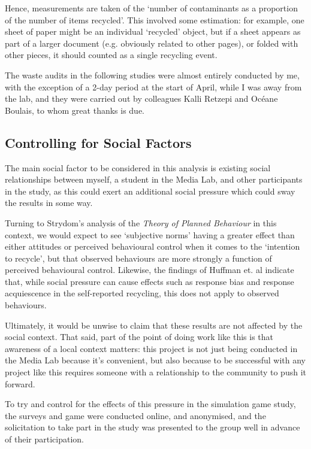 \documentclass[nofonts,nols,justified,nobib]{tufte-book}
\begin{document}
Hence, measurements are taken of the ‘number of contaminants as a proportion of the number of items recycled’. This involved some estimation: for example, one sheet of paper might be an individual ‘recycled’ object, but if a sheet appears as part of a larger document (e.g. obviously related to other pages), or folded with other pieces, it should counted as a single recycling event. 

The waste audits in the following studies were almost entirely conducted by me, with the exception of a 2-day period at the start of April, while I was away from the lab, and they were carried out by colleagues Kalli Retzepi and Oc\'eane Boulais, to whom great thanks is due.

\subsection*{Controlling for Social Factors}
The main social factor to be considered in this analysis is existing social relationships between myself, a student in the Media Lab, and other participants in the study, as this could exert an additional social pressure which could sway the results in some way.

Turning to Strydom's analysis of the \emph{Theory of Planned Behaviour} in this context, we would expect to see `subjective norms' having a greater effect than either attitudes or perceived behavioural control when it comes to the `intention to recycle', but that observed behaviours are more strongly a function of perceived behavioural control. Likewise, the findings of Huffman et. al indicate that, while social pressure can cause effects such as response bias and response acquiescence in the self-reported recycling, this does not apply to observed behaviours. 

Ultimately, it would be unwise to claim that these results are not affected by the social context. That said, part of the point of doing work like this is that awareness of a local context matters: this project is not just being conducted in the Media Lab because it’s convenient, but also because to be successful with any project like this requires someone with a relationship to the community to push it forward.

To try and control for the effects of this pressure in the simulation game study, the surveys and game were conducted online, and anonymised, and the solicitation to take part in the study was presented to the group well in advance of their participation.
\end{document}
